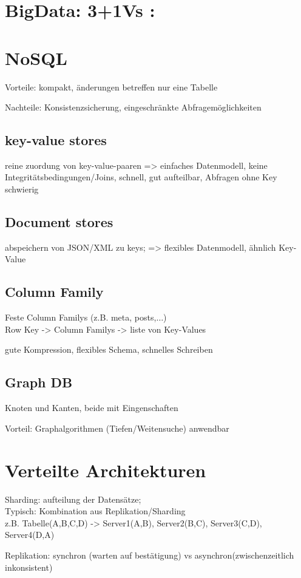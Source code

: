 
\section{BigData: 3+1Vs : }

\section{NoSQL}
Vorteile: kompakt, änderungen betreffen nur eine Tabelle

Nachteile: Konsistenzsicherung, eingeschränkte Abfragemöglichkeiten
\subsection{key-value stores}
reine zuordung von key-value-paaren => einfaches Datenmodell, keine Integritätsbedingungen/Joins, schnell, gut aufteilbar, Abfragen ohne Key schwierig

\subsection{Document stores}
abspeichern von JSON/XML zu keys; => flexibles Datenmodell, ähnlich Key-Value


\subsection{Column Family}
Feste Column Familys (z.B. meta, posts,$\dots$) \\
Row Key -> Column Familys -> liste von Key-Values

gute Kompression, flexibles Schema, schnelles Schreiben

\subsection{Graph DB}
Knoten und Kanten, beide mit Eingenschaften

Vorteil: Graphalgorithmen (Tiefen/Weitensuche) anwendbar

\section{Verteilte Architekturen}

Sharding: aufteilung der Datensätze; \\
Typisch: Kombination aus Replikation/Sharding\\
z.B. Tabelle(A,B,C,D) -> Server1(A,B), Server2(B,C), Server3(C,D), Server4(D,A)

Replikation: synchron (warten auf bestätigung) vs asynchron(zwischenzeitlich inkonsistent)

